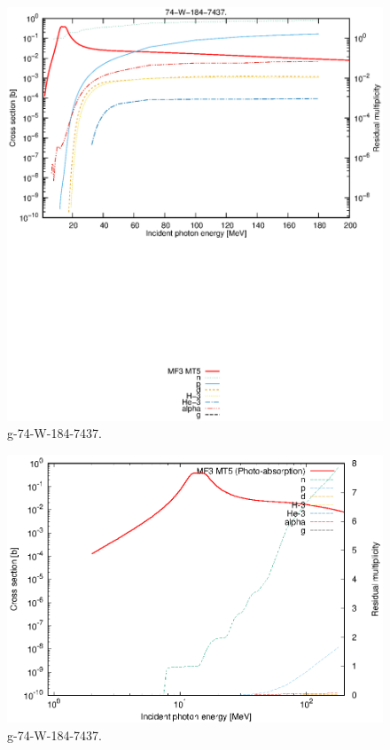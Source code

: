 \begin{figure}
 \includegraphics[width=\linewidth]{eps/g_74-W-184_7437.eps}
  \caption{g-74-W-184-7437.}
\end{figure}
\newpage \clearpage

\begin{figure}
 \includegraphics[width=\linewidth]{eps-log/g_74-W-184_7437.eps}
 \caption{g-74-W-184-7437.}
\end{figure}
\newpage \clearpage

